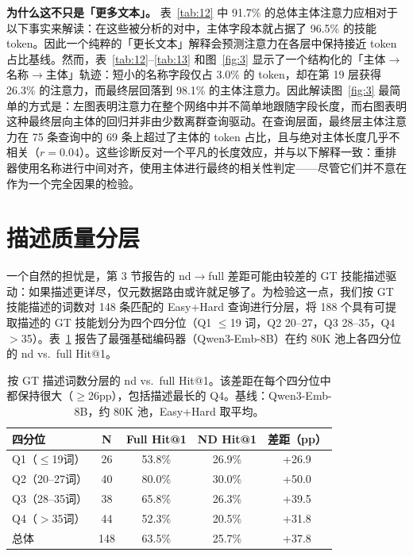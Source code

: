 \documentclass[11pt,UTF8,fontset=fandol]{ctexart}
\makeatletter
\newcommand{\Hit}{Hit@1}
\makeatother
\begin{document}
\textbf{为什么这不只是「更多文本」。} 表~\ref{tab:12} 中 91.7\% 的总体主体注意力应相对于以下事实来解读：在这些被分析的对中，主体字段本就占据了 96.5\% 的技能 token。因此一个纯粹的「更长文本」解释会预测注意力在各层中保持接近 token 占比基线。然而，表~\ref{tab:12}--\ref{tab:13} 和图~\ref{fig:3} 显示了一个结构化的「主体$\rightarrow$名称$\rightarrow$主体」轨迹：短小的名称字段仅占 3.0\% 的 token，却在第 19 层获得 26.3\% 的注意力，而最终层回落到 98.1\% 的主体注意力。因此解读图~\ref{fig:3} 最简单的方式是：左图表明注意力在整个网络中并不简单地跟随字段长度，而右图表明这种最终层向主体的回归并非由少数离群查询驱动。在查询层面，最终层主体注意力在 75 条查询中的 69 条上超过了主体的 token 占比，且与绝对主体长度几乎不相关（$r = 0.04$）。这些诊断反对一个平凡的长度效应，并与以下解释一致：重排器使用名称进行中间对齐，使用主体进行最终的相关性判定——尽管它们并不意在作为一个完全因果的检验。

\section{描述质量分层}

一个自然的担忧是，第 3 节报告的 nd$\rightarrow$full 差距可能由较差的 GT 技能描述驱动：如果描述更详尽，仅元数据路由或许就足够了。为检验这一点，我们按 GT 技能描述的词数对 148 条匹配的 Easy+Hard 查询进行分层，将 188 个具有可提取描述的 GT 技能划分为四个四分位（Q1 $\leq$19 词，Q2 20--27，Q3 28--35，Q4 $>$35）。表~\ref{tab:14} 报告了最强基础编码器（Qwen3-Emb-8B）在约 80K 池上各四分位的 nd vs.\ full \Hit{}。

\begin{table}[H]\centering
\caption{按 GT 描述词数分层的 nd vs.\ full \Hit{}。该差距在每个四分位中都保持很大（$\geq$26pp），包括描述最长的 Q4。基线：Qwen3-Emb-8B，约 80K 池，Easy+Hard 取平均。}
\begin{tabular}{lcccc}
\toprule
四分位 & N & Full \Hit{} & ND \Hit{} & 差距（pp） \\ \midrule
Q1（$\leq$19词） & 26 & 53.8\% & 26.9\% & +26.9 \\
Q2（20--27词） & 40 & 80.0\% & 30.0\% & +50.0 \\
Q3（28--35词） & 38 & 65.8\% & 26.3\% & +39.5 \\
Q4（$>$35词） & 44 & 52.3\% & 20.5\% & +31.8 \\
总体 & 148 & 63.5\% & 25.7\% & +37.8 \\
\bottomrule
\end{tabular}
\label{tab:14}
\end{table}
\end{document}
